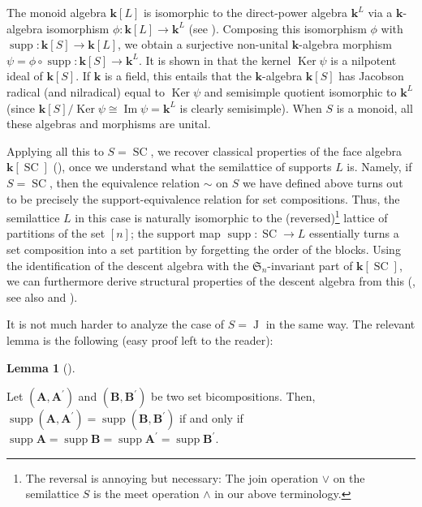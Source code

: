 \documentclass[numbers=enddot,12pt,final,onecolumn,notitlepage]{scrartcl}%
\theoremstyle{definition}
\newtheorem{lem}[theo]{Lemma}
\newenvironment{lemma}[1][]
{\begin{lem}[#1]\begin{leftbar}}
{\end{leftbar}\end{lem}}
\begin{document}
The monoid algebra $\mathbf{k}\left[  L\right]  $ is isomorphic to the
direct-power algebra $\mathbf{k}^{L}$ via a $\mathbf{k}$-algebra isomorphism
$\phi:\mathbf{k}\left[  L\right]  \rightarrow\mathbf{k}^{L}$ (see
\cite[\S B.1]{Brown04}). Composing this isomorphism $\phi$ with
$\operatorname*{supp}:\mathbf{k}\left[  S\right]  \rightarrow\mathbf{k}\left[
L\right]  $, we obtain a surjective non-unital $\mathbf{k}$-algebra morphism
$\psi=\phi\circ\operatorname*{supp}:\mathbf{k}\left[  S\right]  \rightarrow
\mathbf{k}^{L}$. It is shown in \cite[Theorem B.1]{Brown04} that the kernel
$\operatorname*{Ker}\psi$ is a nilpotent ideal of $\mathbf{k}\left[  S\right]
$. If $\mathbf{k}$ is a field, this entails that the $\mathbf{k}$-algebra
$\mathbf{k}\left[  S\right]  $ has Jacobson radical (and nilradical) equal to
$\operatorname*{Ker}\psi$ and semisimple quotient isomorphic to $\mathbf{k}%
^{L}$ (since $\mathbf{k}\left[  S\right]  /\operatorname*{Ker}\psi
\cong\operatorname{Im}\psi=\mathbf{k}^{L}$ is clearly semisimple). When $S$ is
a monoid, all these algebras and morphisms are unital.

Applying all this to $S=\operatorname*{SC}$, we recover classical properties
of the face algebra $\mathbf{k}\left[  \operatorname*{SC}\right]  $
(\cite[\S 2.3.3]{Bidiga97}), once we understand what the semilattice of
supports $L$ is. Namely, if $S=\operatorname*{SC}$, then the equivalence
relation $\sim$ on $S$ we have defined above turns out to be precisely the
support-equivalence relation for set compositions. Thus, the semilattice $L$
in this case is naturally isomorphic to the (reversed)\footnote{The reversal
is annoying but necessary: The join operation $\vee$ on the semilattice $S$ is
the meet operation $\wedge$ in our above terminology.} lattice of partitions
of the set $\left[  n\right]  $; the support map $\operatorname*{supp}%
:\operatorname*{SC}\rightarrow L$ essentially turns a set composition into a
set partition by forgetting the order of the blocks. Using the identification
of the descent algebra with the $\mathfrak{S}_{n}$-invariant part of
$\mathbf{k}\left[  \operatorname*{SC}\right]  $, we can furthermore derive
structural properties of the descent algebra from this (\cite[Theorem 3 in the
type-A case]{Solomo76}, see also \cite[\S 3.8.5]{Bidiga97} and \cite[Theorem
1.1]{GarReu89}).

It is not much harder to analyze the case of $S=\operatorname*{J}$ in the same
way. The relevant lemma is the following (easy proof left to the reader):

\begin{lemma}
Let $\left(  \mathbf{A},\mathbf{A}^{\prime}\right)  $ and $\left(
\mathbf{B},\mathbf{B}^{\prime}\right)  $ be two set bicompositions. Then,
$\operatorname*{supp}\left(  \mathbf{A},\mathbf{A}^{\prime}\right)
=\operatorname*{supp}\left(  \mathbf{B},\mathbf{B}^{\prime}\right)  $ if and
only if $\operatorname*{supp}\mathbf{A}=\operatorname*{supp}\mathbf{B}%
=\operatorname*{supp}\mathbf{A}^{\prime}=\operatorname*{supp}\mathbf{B}%
^{\prime}$.
\end{lemma}
\end{document}
